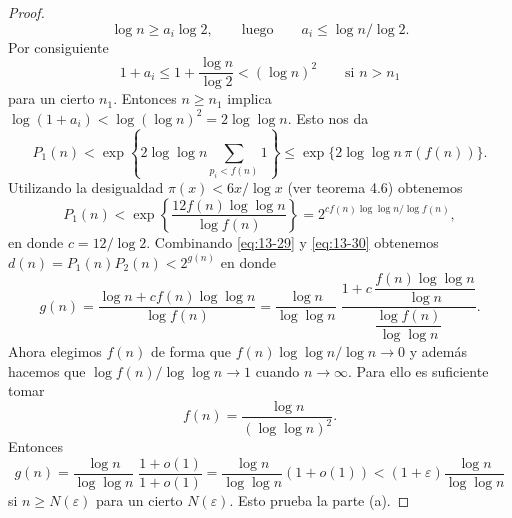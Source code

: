 \documentclass[12pt,a4paper]{book}
\begin{document}
\begin{proof}
\begin{equation*}
            \log n\geq a_{i}\log2,\qquad\text{luego}\qquad a_{i}\leq\log n/\log2.
        \end{equation*}
        Por consiguiente
        \begin{equation*}
            1+a_{i}\leq1+\frac{\log n}{\log2}<(\log n)^{2}\qquad\text{si }n>n_{1}
        \end{equation*}
        para un cierto $n_{1}$. Entonces $n\geq n_{1}$ implica
        $\log(1+a_{i})<\log(\log n)^{2}=2\log\log n$. Esto nos da
        \begin{equation*}
            P_{1}(n)<\exp\left\{2\log\log n\sum_{p_{i}<f(n)}1\right\}\leq\exp\{2\log\log n\,\pi(f(n))\}.
        \end{equation*}
        Utilizando la desigualdad $\pi(x)<6x/\log x$ (ver teorema 4.6) obtenemos
        \begin{equation}\label{eq:13-30}
            P_{1}(n)<\exp\left\{\frac{12f(n)\log\log n}{\log f(n)}\right\}=2^{cf(n)\log\log n/\log f(n)},
        \end{equation}
        en donde $c=12/\log2$. Combinando \eqref{eq:13-29} y \eqref{eq:13-30} obtenemos
        $d(n)=P_{1}(n)P_{2}(n)<2^{g(n)}$ en donde
        \begin{equation*}
            g(n)=\frac{\log n+cf(n)\log\log n}{\log f(n)}=\frac{\log n}{\log\log n}\;\frac{1+c\,\dfrac{f(n)\log\log n}{\log n}}{\dfrac{\log f(n)}{\log\log n}}.
        \end{equation*}
        Ahora elegimos $f(n)$ de forma que $f(n)\log\log n/\log n\to0$ y además hacemos que
        $\log f(n)/\log\log n\to1$ cuando $n\to\infty$. Para ello es suficiente tomar
        \begin{equation*}
            f(n)=\frac{\log n}{(\log\log n)^{2}}.
        \end{equation*}
        Entonces
        \begin{equation*}
            g(n)=\frac{\log n}{\log\log n}\;\frac{1+o(1)}{1+o(1)}=\frac{\log n}{\log\log n}(1+o(1))<(1+\varepsilon)\frac{\log n}{\log\log n}
        \end{equation*}
        si $n\geq N(\varepsilon)$ para un cierto $N(\varepsilon)$. Esto prueba la parte (a).


\end{proof}
\end{document}
